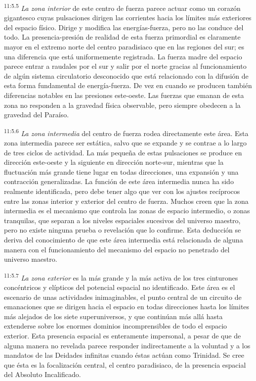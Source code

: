 \par
\textsuperscript{11:5.5} \textit{La zona interior} de este centro de fuerza parece actuar como un corazón gigantesco cuyas pulsaciones dirigen las corrientes hacia los límites más exteriores del espacio físico. Dirige y modifica las energías-fuerza, pero no las conduce del todo. La presencia-presión de realidad de esta fuerza primordial es claramente mayor en el extremo norte del centro paradisiaco que en las regiones del sur; es una diferencia que está uniformemente registrada. La fuerza madre del espacio parece entrar a raudales por el sur y salir por el norte gracias al funcionamiento de algún sistema circulatorio desconocido que está relacionado con la difusión de esta forma fundamental de energía-fuerza. De vez en cuando se producen también diferencias notables en las presiones este-oeste. Las fuerzas que emanan de esta zona no responden a la gravedad física observable, pero siempre obedecen a la gravedad del Paraíso.

\par
\textsuperscript{11:5.6} \textit{La zona intermedia} del centro de fuerza rodea directamente este área. Esta zona intermedia parece ser estática, salvo que se expande y se contrae a lo largo de tres ciclos de actividad. La más pequeña de estas pulsaciones se produce en dirección este-oeste y la siguiente en dirección norte-sur, mientras que la fluctuación más grande tiene lugar en todas direcciones, una expansión y una contracción generalizadas. La función de este área intermedia nunca ha sido realmente identificada, pero debe tener algo que ver con los ajustes recíprocos entre las zonas interior y exterior del centro de fuerza. Muchos creen que la zona intermedia es el mecanismo que controla las zonas de espacio intermedio, o zonas tranquilas, que separan a los niveles espaciales sucesivos del universo maestro, pero no existe ninguna prueba o revelación que lo confirme. Esta deducción se deriva del conocimiento de que este área intermedia está relacionada de alguna manera con el funcionamiento del mecanismo del espacio no penetrado del universo maestro.

\par
\textsuperscript{11:5.7} \textit{La zona exterior} es la más grande y la más activa de los tres cinturones concéntricos y elípticos del potencial espacial no identificado. Este área es el escenario de unas actividades inimaginables, el punto central de un circuito de emanaciones que se dirigen hacia el espacio en todas direcciones hasta los límites más alejados de los siete superuniversos, y que continúan más allá hasta extenderse sobre los enormes dominios incomprensibles de todo el espacio exterior. Esta presencia espacial es enteramente impersonal, a pesar de que de alguna manera no revelada parece responder indirectamente a la voluntad y a los mandatos de las Deidades infinitas cuando éstas actúan como Trinidad. Se cree que ésta es la focalización central, el centro paradisiaco, de la presencia espacial del Absoluto Incalificado.

